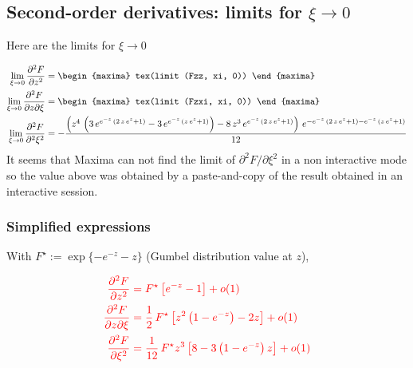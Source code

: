 \subsection{Second-order derivatives: limits for $\xi \to 0$}

Here are the limits for $\xi \to 0$

\begin{align*}
  \lim_{\xi \to 0} \frac{\partial^2 F}{\partial z^2}
  &=
    \begin{maxima}
      tex(limit (Fzz, xi, 0))
    \end{maxima}
  \\
  \lim_{\xi \to 0} \frac{\partial^2 F}{\partial z \partial \xi}
  &=
    \begin{maxima}
      tex(limit (Fzxi, xi, 0))
    \end{maxima}
  \\
  \lim_{\xi \to 0} \frac{\partial^2 F}{\partial^2 \xi^2}
  &= -{{\left(z^4\,\left(3\,e^{e^ {- z }\,\left(2\,z\,e^{z}+1\right)}-3
 \,e^{e^ {- z }\,\left(z\,e^{z}+1\right)}\right)-8\,z^3\,e^{e^ {- z }
 \,\left(2\,z\,e^{z}+1\right)}\right)\,e^{-e^ {- z }\,\left(2\,z\,e^{
 z}+1\right)-e^ {- z }\,\left(z\,e^{z}+1\right)}}\over{12}}
\end{align*}
It seems that Maxima can not find the limit of
$\partial^2 F/\partial \xi^2$ in a non interactive mode so the value
above was obtained by a paste-and-copy of the result obtained in an
interactive session.

\subsubsection*{Simplified expressions}

With $F^\star := \exp\{-e^{-z} - z\}$ (Gumbel distribution value at $z$), 

\begin{equation}
  \color{red}
  \label{eq:SimpDer2F}
  \begin{aligned}
    \frac{\partial^2 F}{\partial z^2} 
    &= F^\star \left[ e^{-z} - 1  \right] + o(1) \\
    \frac{\partial^2 F}{\partial z \partial \xi}
    &= \frac{1}{2} \, F^\star \left[ z^2 \left(1 - e^{-z} \right) - 2 z  \right] +
      o(1)\\
    \frac{\partial^2 F}{\partial \xi^2}
    &= \frac{1}{12} \, F^\star z^3 \left[ 8 - 3 \left(1 - e^{-z}\right) z \right]+ o(1)
  \end{aligned}
\end{equation}


